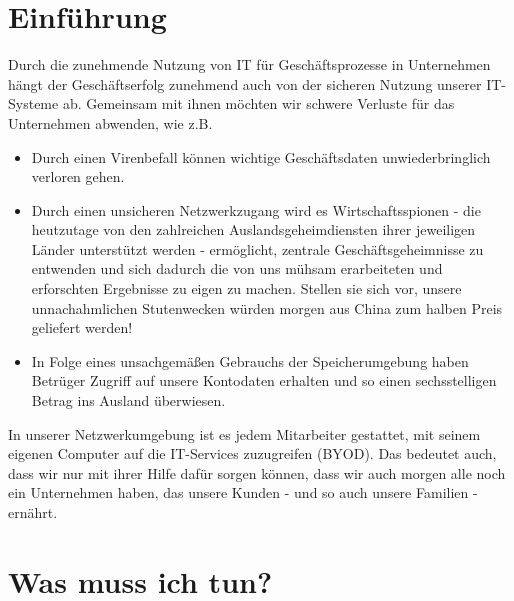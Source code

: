 \documentclass[]{article}
\date{}
\begin{document}
\section{Einführung}\label{einfuxfchrung}

Durch die zunehmende Nutzung von IT für Geschäftsprozesse in Unternehmen
hängt der Geschäftserfolg zunehmend auch von der sicheren Nutzung
unserer IT-Systeme ab. Gemeinsam mit ihnen möchten wir schwere
Verluste für das Unternehmen abwenden, wie z.B.

\begin{itemize}
\item
  Durch einen Virenbefall können wichtige Geschäftsdaten
  unwiederbringlich verloren gehen.
\item
  Durch einen unsicheren Netzwerkzugang wird es Wirtschaftsspionen - die
  heutzutage von den zahlreichen Auslandsgeheimdiensten ihrer jeweiligen
  Länder unterstützt werden - ermöglicht, zentrale Geschäftsgeheimnisse
  zu entwenden und sich dadurch die von uns mühsam erarbeiteten und
  erforschten Ergebnisse zu eigen zu machen. Stellen sie sich vor,
  unsere unnachahmlichen Stutenwecken würden morgen aus China zum halben
  Preis geliefert werden!
\item
  In Folge eines unsachgemäßen Gebrauchs der Speicherumgebung haben
  Betrüger Zugriff auf unsere Kontodaten erhalten und so einen
  sechsstelligen Betrag ins Ausland überwiesen.
\end{itemize}

In unserer Netzwerkumgebung ist es jedem Mitarbeiter gestattet, mit
seinem eigenen Computer auf die IT-Services zuzugreifen (BYOD). Das
bedeutet auch, dass wir nur mit ihrer Hilfe dafür sorgen können, dass
wir auch morgen alle noch ein Unternehmen haben, das unsere Kunden -
und so auch unsere Familien - ernährt.

\section{Was muss ich tun?}\label{was-muss-ich-tun}
\end{document}
